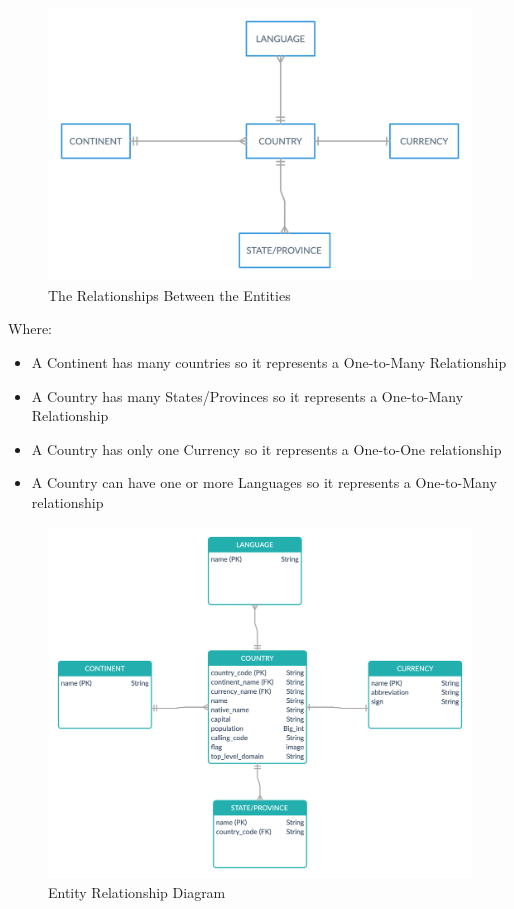 \documentclass[twoside, a4paper, 12pt]{report}
\begin{document}
\begin{figure} [ht]
	\centering
	\includegraphics[width=1.0\textwidth]{relationships.png}
	\caption{The Relationships Between the Entities}
	\label{fig:relationships}
\end{figure}

Where:
\begin{itemize}
	\item A Continent has many countries so it represents a One-to-Many Relationship
	\item A Country has many States/Provinces so it represents a One-to-Many Relationship
	\item A Country has only one Currency so it represents a One-to-One relationship
	\item A Country can have one or more Languages so it represents a One-to-Many relationship
\end{itemize}

\begin{figure} [ht]
	\centering
	\includegraphics[width=1.0\textwidth]{ERD.png}
	\caption{Entity Relationship Diagram}
	\label{fig:ERD}
\end{figure}
\end{document}

